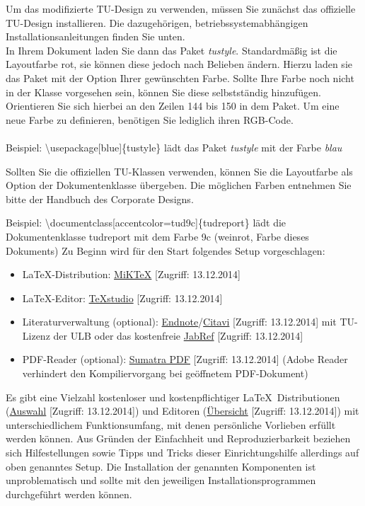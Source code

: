Um das modifizierte TU-Design zu verwenden, müssen Sie zunächst das offizielle TU-Design installieren. Die dazugehörigen, betriebssystemabhängigen Installationsanleitungen finden Sie unten.\\
In Ihrem Dokument laden Sie dann das Paket \emph{tustyle}. Standardmäßig ist die Layoutfarbe rot, sie können diese jedoch nach Belieben ändern. Hierzu laden sie das Paket mit der Option Ihrer gewünschten Farbe. Sollte Ihre Farbe noch nicht in der Klasse vorgesehen sein, können Sie diese selbstständig hinzufügen. Orientieren Sie sich hierbei an den Zeilen 144 bis 150 in dem Paket. Um eine neue Farbe zu definieren, benötigen Sie lediglich ihren RGB-Code.\\ \\
Beispiel: \textbackslash usepackage[blue]\{tustyle\} lädt das Paket \emph{tustyle} mit der Farbe \emph{blau}

Sollten Sie die offiziellen TU-Klassen verwenden, können Sie die Layoutfarbe als Option der Dokumentenklasse übergeben. Die möglichen Farben entnehmen Sie bitte der Handbuch des Corporate Designs.

Beispiel: \textbackslash documentclass[accentcolor=tud9c]\{tudreport\} lädt die Dokumentenklasse tudreport mit dem Farbe 9c (weinrot, Farbe dieses Dokuments)
Zu Beginn wird für den Start folgendes Setup vorgeschlagen:
\begin{itemize}
\item \LaTeX-Distribution: \href{http://miktex.org/download}{MiKTeX} [Zugriff: 13.12.2014]
\item \LaTeX-Editor: \href{http://texstudio.sourceforge.net/}{TeXstudio} [Zugriff: 13.12.2014]
\item Literaturverwaltung (optional):
\href{http://www.ulb.tu-darmstadt.de/service/literaturverwaltung_start/endnote_ulb/endnote.de.jsp}{Endnote}/\href{http://www.ulb.tu-darmstadt.de/service/literaturverwaltung_start/citavi_ulb/citavi_ulb.de.jsp}{Citavi} [Zugriff: 13.12.2014] mit TU-Lizenz der ULB oder das kostenfreie \href{http://jabref.sourceforge.net/download.php}{JabRef} [Zugriff: 13.12.2014]
\item PDF-Reader (optional): \href{http://blog.kowalczyk.info/software/sumatrapdf/download-free-pdf-viewer-de.html}{Sumatra PDF} [Zugriff: 13.12.2014] (Adobe Reader verhindert den Kompiliervorgang bei geöffnetem PDF-Dokument)
\end{itemize}
Es gibt eine Vielzahl kostenloser und kostenpflichtiger \LaTeX\ Distributionen (\href{http://www.tug.org/interest.html#free}{Auswahl} [Zugriff: 13.12.2014]) und Editoren (\href{http://en.wikipedia.org/wiki/Comparison_of_TeX_editors}{Übersicht} [Zugriff: 13.12.2014]) mit unterschiedlichem Funktionsumfang, mit denen persönliche Vorlieben erfüllt werden können.
Aus Gründen der Einfachheit und Reproduzierbarkeit beziehen sich Hilfestellungen sowie Tipps und Tricks dieser Einrichtungshilfe allerdings auf oben genanntes Setup. Die Installation der genannten Komponenten ist unproblematisch und sollte mit den jeweiligen Installationsprogrammen durchgeführt werden können.

